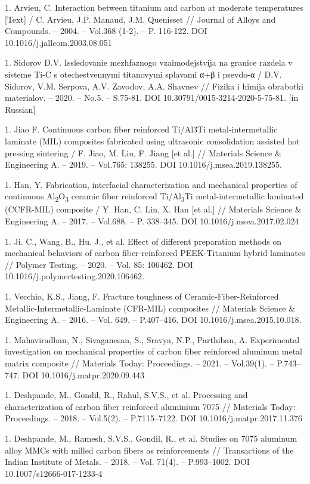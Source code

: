 1. Arvieu, C. Interaction between titanium and carbon at moderate
temperatures {[}Text{]} / C. Arvieu, J.P. Manaud, J.M. Quenisset //
Journal of Alloys and Compounds. -- 2004. -- Vol.368 (1-2). -- P.
116-122. DOI 10.1016/j.jallcom.2003.08.051

1. Sidorov D.V. Issledovanie mezhfaznogo vzaimodejstvija na granice
razdela v sisteme Ti-C s otechestvennymi titanovymi splavami α+β i
psevdo-α / D.V. Sidorov, V.M. Serpova, A.V. Zavodov, A.A. Shavnev //
Fizika i himija obrabotki materialov. -- 2020. -- No.5. -- S.75-81.
DOI 10.30791/0015-3214-2020-5-75-81. {[}in Russian{]}

1. Jiao F. Continuous carbon fiber reinforced Ti/Al3Ti
metal-intermetallic laminate (MIL) composites fabricated using
ultrasonic consolidation assisted hot pressing sintering / F. Jiao, M.
Liu, F. Jiang {[}et al.{]} // Materials Science \& Engineering A. --
2019. -- Vol.765: 138255. DOI 10.1016/j.msea.2019.138255.

1. Han, Y. Fabrication, interfacial characterization and mechanical
properties of continuous Al\textsubscript{2}O\textsubscript{3} ceramic
fiber reinforced Ti/Al\textsubscript{3}Ti metal-intermetallic
laminated (CCFR-MIL) composite / Y. Han, C. Lin, X. Han {[}et al.{]}
// Materials Science \& Engineering A. -- 2017. -- Vol.688. -- P.
338--345. DOI 10.1016/j.msea.2017.02.024

1. Ji. C., Wang. B., Hu. J., et al. Effect of different preparation
methods on mechanical behaviors of carbon fiber-reinforced
PEEK-Titanium hybrid laminates // Polymer Testing. -- 2020. -- Vol.
85: 106462. DOI 10.1016/j.polymertesting.2020.106462.

1. Vecchio, K.S., Jiang, F. Fracture toughness of
Ceramic-Fiber-Reinforced Metallic-Intermetallic-Laminate (CFR-MIL)
composites // Materials Science \& Engineering A. -- 2016. -- Vol.
649. -- P.407--416. DOI 10.1016/j.msea.2015.10.018.

1. Mahaviradhan, N., Sivaganesan, S., Sravya, N.P., Parthiban, A.
Experimental investigation on mechanical properties of carbon fiber
reinforced aluminum metal matrix composite // Materials Today:
Proceedings. -- 2021. -- Vol.39(1). -- P.743--747. DOI
10.1016/j.matpr.2020.09.443

1. Deshpande, M., Gondil, R., Rahul, S.V.S., et al. Processing and
characterization of carbon fiber reinforced aluminium 7075 //
Materials Today: Proceedings. -- 2018. -- Vol.5(2). -- P.7115--7122.
DOI 10.1016/j.matpr.2017.11.376

1. Deshpande, M., Ramesh, S.V.S., Gondil, R., et al. Studies on 7075
aluminum alloy MMCs with milled carbon fibers as reinforcements //
Transactions of the Indian Institute of Metals. -- 2018. -- Vol.
71(4). -- P.993--1002. DOI 10.1007/s12666-017-1233-4

